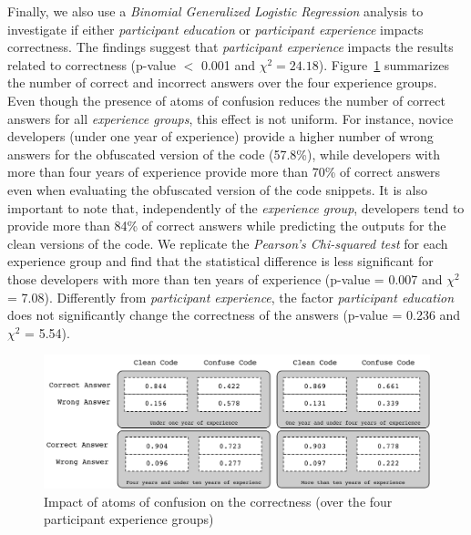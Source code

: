 Finally, we also use a \emph{Binomial Generalized Logistic Regression} analysis to investigate if either \emph{participant education} or \emph{participant experience} impacts correctness. The findings suggest that \emph{participant experience} impacts the results related to correctness (p-value $<$ 0.001 and $\chi^2 = 24.18$).
Figure~\ref{fig:correctness-over-experience} summarizes the number of correct and incorrect answers over the four experience groups. Even though the presence of atoms of confusion reduces the number of correct answers for all \emph{experience groups}, this effect is not uniform. For instance, novice developers (under one year of experience) provide a higher number of wrong answers for the obfuscated version of the code (57.8\%), while developers with more than four years of experience provide more than 70\% of correct answers even when evaluating the obfuscated version of the code snippets. It is also important to note that, independently of the \emph{experience group}, developers tend to provide more than 84\% of correct answers while predicting the outputs for the clean versions of the code. We replicate the \emph{Pearson's Chi-squared test} for each experience group and find that the statistical difference is less significant for those developers with more than ten years of experience (p-value = 0.007 and $\chi^2$ = 7.08). Differently from \emph{participant experience}, the factor \emph{participant education} does not significantly change the correctness of the answers (p-value = 0.236 and $\chi^2$ = 5.54).


\begin{figure}
  \centering
  \includegraphics[scale=0.5]{images/correctness-by-experience}
  \caption{Impact of atoms of confusion on the correctness (over the four participant experience groups)}
  \label{fig:correctness-over-experience}
\end{figure}


